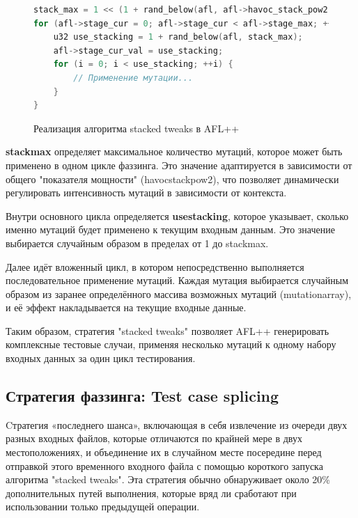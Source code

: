 \begin{figure}[ht]
	\begin{lstlisting}[language=C]
	stack_max = 1 << (1 + rand_below(afl, afl->havoc_stack_pow2));
for (afl->stage_cur = 0; afl->stage_cur < afl->stage_max; ++afl->stage_cur) {
	u32 use_stacking = 1 + rand_below(afl, stack_max);
	afl->stage_cur_val = use_stacking;
	for (i = 0; i < use_stacking; ++i) {
		// Применение мутации...
	}
}
	\end{lstlisting}
	\caption{Реализация алгоритма stacked tweaks в AFL++}\label{fig:stacked-tweaks}
\end{figure}
\textbf{stack\textunderscore max} определяет максимальное количество мутаций, которое может быть применено в одном цикле фаззинга. Это значение адаптируется в зависимости от общего "показателя мощности" (havoc\textunderscore stack\textunderscore pow2), что позволяет динамически регулировать интенсивность мутаций в зависимости от контекста.

Внутри основного цикла определяется \textbf{use\textunderscore stacking}, которое указывает, сколько именно мутаций будет применено к текущим входным данным. Это значение выбирается случайным образом в пределах от 1 до stack\textunderscore max.

Далее идёт вложенный цикл, в котором непосредственно выполняется последовательное применение мутаций. Каждая мутация выбирается случайным образом из заранее определённого массива возможных мутаций (mutation\textunderscore array), и её эффект накладывается на текущие входные данные.

Таким образом, стратегия "stacked tweaks" позволяет AFL++ генерировать комплексные тестовые случаи, применяя несколько мутаций к одному набору входных данных за один цикл тестирования.

\subsection{Стратегия фаззинга: Test case splicing} \label{ch2:test-case-splicing}
Cтратегия «последнего шанса», включающая в себя извлечение из очереди двух разных входных файлов, которые отличаются по крайней мере в двух местоположениях, и объединение их в случайном месте посередине перед отправкой этого временного входного файла с помощью короткого запуска алгоритма "stacked tweaks". Эта стратегия обычно обнаруживает около 20\% дополнительных путей выполнения, которые вряд ли сработают при использовании только предыдущей операции.


